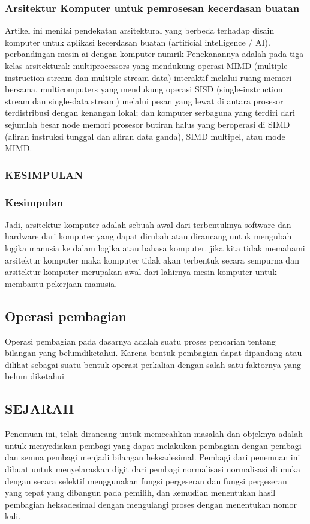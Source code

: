 	\subsubsection{Arsitektur Komputer untuk pemrosesan kecerdasan buatan}
	Artikel ini menilai pendekatan arsitektural yang berbeda terhadap disain komputer untuk aplikasi kecerdasan buatan (artificial intelligence / AI).
	perbandingan mesin ai dengan komputer numrik Penekanannya adalah pada tiga kelas arsitektural: multiprocessors yang mendukung operasi MIMD (multiple-instruction stream dan multiple-stream data) interaktif melalui ruang memori bersama.
	multicomputers yang mendukung operasi SISD (single-instruction stream dan single-data stream) melalui pesan yang lewat di antara prosesor terdistribusi dengan kenangan lokal; dan komputer serbaguna yang terdiri dari sejumlah besar node memori prosesor butiran halus yang beroperasi di SIMD (aliran instruksi tunggal dan aliran data ganda), SIMD multipel, atau mode MIMD.\cite{hwang1987computer}
	
	\subsubsection{KESIMPULAN}
	\subsubsection{Kesimpulan}
	Jadi, arsitektur komputer adalah sebuah awal dari terbentuknya software dan hardware dari komputer yang dapat dirubah atau dirancang untuk mengubah logika manusia ke dalam logika atau bahasa komputer.
	jika kita tidak memahami arsitektur komputer maka komputer tidak akan terbentuk secara sempurna dan arsitektur komputer merupakan awal dari lahirnya mesin komputer untuk membantu pekerjaan manusia.
	
	\subsection{Operasi pembagian}
Operasi pembagian pada dasarnya adalah suatu proses pencarian tentang bilangan yang belumdiketahui. Karena bentuk pembagian dapat dipandang atau dilihat sebagai suatu bentuk operasi perkalian dengan salah satu faktornya yang belum diketahui

\subsection{SEJARAH}
Penemuan ini,  telah dirancang untuk memecahkan masalah dan objeknya adalah untuk menyediakan pembagi yang dapat melakukan pembagian dengan pembagi 
dan semua pembagi menjadi bilangan heksadesimal. Pembagi dari penemuan ini dibuat untuk menyelaraskan digit dari pembagi normalisasi normalisasi di muka 
dengan secara selektif menggunakan fungsi pergeseran dan fungsi pergeseran yang tepat yang dibangun pada pemilih, 
dan kemudian menentukan hasil pembagian heksadesimal dengan mengulangi proses dengan menentukan nomor kali.

